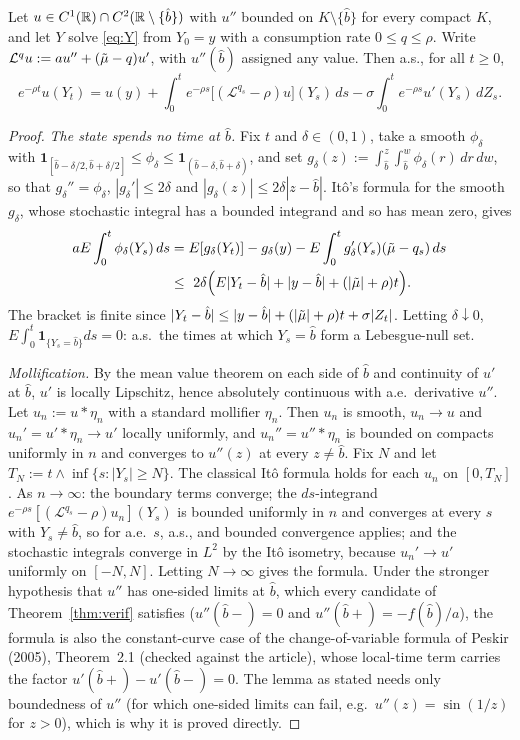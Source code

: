 \begin{alemma}\label{lem:ito}
Let $u\in C^1(\mathbb{R})\cap C^2(\mathbb{R}\setminus\{\hat b\})$ with $u''$ bounded on $K\setminus\{\hat b\}$ for every compact $K$, and let $Y$ solve \eqref{eq:Y} from $Y_0=y$ with a consumption rate $0\le q\le\rho$. Write $\mathcal L^qu:=au''+(\tilde\mu-q)u'$, with $u''(\hat b)$ assigned any value. Then a.s., for all $t\ge0$,
\[
e^{-\rho t}u(Y_t)=u(y)+\int_0^t e^{-\rho s}\big[(\mathcal L^{q_s}-\rho)u\big](Y_s)\,ds-\sigma\int_0^t e^{-\rho s}u'(Y_s)\,dZ_s .
\]
\end{alemma}

\begin{proof}
\emph{The state spends no time at $\hat b$.} Fix $t$ and $\delta\in(0,1)$, take a smooth $\phi_\delta$ with $\mathbf 1_{[\hat b-\delta/2,\hat b+\delta/2]}\le\phi_\delta\le\mathbf 1_{(\hat b-\delta,\hat b+\delta)}$, and set $g_\delta(z):=\int_{\hat b}^z\int_{\hat b}^w\phi_\delta(r)\,dr\,dw$, so that $g_\delta''=\phi_\delta$, $|g_\delta'|\le2\delta$ and $|g_\delta(z)|\le2\delta|z-\hat b|$. It\^o's formula for the smooth $g_\delta$, whose stochastic integral has a bounded integrand and so has mean zero, gives
\begin{align*}
aE\int_0^t\phi_\delta(Y_s)\,ds&=E[g_\delta(Y_t)]-g_\delta(y)-E\int_0^tg_\delta'(Y_s)(\tilde\mu-q_s)\,ds\\
&\le\ 2\delta\Big(E|Y_t-\hat b|+|y-\hat b|+(|\tilde\mu|+\rho)t\Big).
\end{align*}
The bracket is finite since $|Y_t-\hat b|\le|y-\hat b|+(|\tilde\mu|+\rho)t+\sigma|Z_t|$. Letting $\delta\downarrow0$, $E\int_0^t\mathbf 1_{\{Y_s=\hat b\}}ds=0$: a.s.\ the times at which $Y_s=\hat b$ form a Lebesgue-null set.

\emph{Mollification.} By the mean value theorem on each side of $\hat b$ and continuity of $u'$ at $\hat b$, $u'$ is locally Lipschitz, hence absolutely continuous with a.e.\ derivative $u''$. Let $u_n:=u*\eta_n$ with a standard mollifier $\eta_n$. Then $u_n$ is smooth, $u_n\to u$ and $u_n'=u'*\eta_n\to u'$ locally uniformly, and $u_n''=u''*\eta_n$ is bounded on compacts uniformly in $n$ and converges to $u''(z)$ at every $z\ne\hat b$. Fix $N$ and let $T_N:=t\wedge\inf\{s:|Y_s|\ge N\}$. The classical It\^o formula holds for each $u_n$ on $[0,T_N]$. As $n\to\infty$: the boundary terms converge; the $ds$-integrand $e^{-\rho s}[(\mathcal L^{q_s}-\rho)u_n](Y_s)$ is bounded uniformly in $n$ and converges at every $s$ with $Y_s\ne\hat b$, so for a.e.\ $s$, a.s., and bounded convergence applies; and the stochastic integrals converge in $L^2$ by the It\^o isometry, because $u_n'\to u'$ uniformly on $[-N,N]$. Letting $N\to\infty$ gives the formula. Under the stronger hypothesis that $u''$ has one-sided limits at $\hat b$, which every candidate of Theorem~\ref{thm:verif} satisfies ($u''(\hat b-)=0$ and $u''(\hat b+)=-f(\hat b)/a$), the formula is also the constant-curve case of the change-of-variable formula of Peskir (2005), Theorem~2.1 (checked against the article), whose local-time term carries the factor $u'(\hat b+)-u'(\hat b-)=0$. The lemma as stated needs only boundedness of $u''$ (for which one-sided limits can fail, e.g.\ $u''(z)=\sin(1/z)$ for $z>0$), which is why it is proved directly.
\end{proof}


